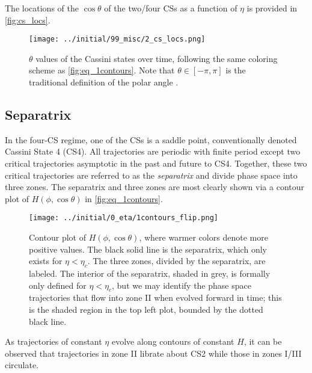 \documentclass[
        fleqn,
        usenatbib,
    ]{mnras}
\newcommand*{\p}[1]{\left(#1\right)}
\begin{document}
The locations of the $\cos\theta$ of the two/four CSs as a function of $\eta$ is
provided in \autoref{fig:cs_locs}.
\begin{figure}
    \centering
    \texttt{[image: ../initial/99\_misc/2\_cs\_locs.png]}
    \caption{$\theta$ values of the Cassini states over time, following the same
    coloring scheme as \autoref{fig:eq_1contours}. Note that $\theta \in [-\pi,
    \pi]$ is the traditional definition of the polar angle
    \citep[see e.g.][]{colombo1966,peale1969,henrard1987}.}\label{fig:cs_locs}
\end{figure}

\subsection{Separatrix}

In the four-CS regime, one of the CSs is a saddle point, conventionally denoted
Cassini State 4 (CS4). All trajectories are periodic with finite period except
two critical trajectories asymptotic in the past and future to CS4. Together,
these two critical trajectories are referred to as the \emph{separatrix} and
divide phase space into three zones. The separatrix and three zones are most
clearly shown via a contour plot of $H\p{\phi, \cos \theta}$ in
\autoref{fig:eq_1contours}.
\begin{figure*}
    \centering
    \texttt{[image: ../initial/0\_eta/1contours\_flip.png]}
    \caption{Contour plot of $H\p{\phi, \cos \theta}$, where warmer colors
    denote more positive values. The black solid line is the separatrix, which
    only exists for $\eta < \eta_c$. The three zones, divided by the separatrix,
    are labeled. The interior of the separatrix, shaded in grey, is formally
    only defined for $\eta < \eta_c$, but we may identify the phase space
    trajectories that flow into zone II when evolved forward in time; this is
    the shaded region in the top left plot, bounded by the dotted black
    line.}\label{fig:eq_1contours}
\end{figure*}

As trajectories of constant $\eta$ evolve along
contours of constant $H$, it can be observed that trajectories in zone II
librate about CS2 while those in zones I/III circulate.
\end{document}
